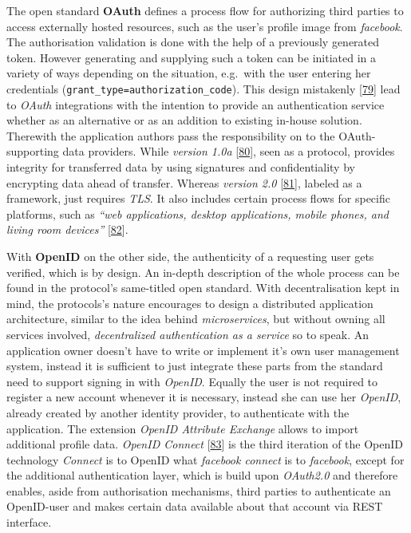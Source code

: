 \documentclass[12pt,english,a4paper,titlepage,cleardoublepage=empty,dottedtoc]{report}
\begin{document}
The open standard \textbf{OAuth} defines a process flow for authorizing
third parties to access externally hosted resources, such as the user's
profile image from \emph{facebook}. The authorisation validation is done
with the help of a previously generated token. However generating and
supplying such a token can be initiated in a variety of ways depending
on the situation, e.g.~with the user entering her credentials
(\texttt{grant\_type=authorization\_code}). This design mistakenly
{[}\protect\hyperlink{ref-web_2012_problem-with-oauth-for-authentication}{79}{]}
lead to \emph{OAuth} integrations with the intention to provide an
authentication service whether as an alternative or as an addition to
existing in-house solution. Therewith the application authors pass the
responsibility on to the OAuth-supporting data providers. While
\emph{version 1.0a} {[}\protect\hyperlink{ref-web_spec_oauth-1a}{80}{]},
seen as a protocol, provides integrity for transferred data by using
signatures and confidentiality by encrypting data ahead of transfer.
Whereas \emph{version 2.0}
{[}\protect\hyperlink{ref-web_spec_oauth-2}{81}{]}, labeled as a
framework, just requires \emph{TLS}. It also includes certain process
flows for specific platforms, such as \emph{``web applications, desktop
applications, mobile phones, and living room devices''}
{[}\protect\hyperlink{ref-web_2016_oauth-2}{82}{]}.

With \textbf{OpenID} on the other side, the authenticity of a requesting
user gets verified, which is by design. An in-depth description of the
whole process can be found in the protocol's same-titled open standard.
With decentralisation kept in mind, the protocols's nature encourages to
design a distributed application architecture, similar to the idea
behind \emph{microservices}, but without owning all services involved,
\emph{decentralized authentication as a service} so to speak. An
application owner doesn't have to write or implement it's own user
management system, instead it is sufficient to just integrate these
parts from the standard need to support signing in with \emph{OpenID}.
Equally the user is not required to register a new account whenever it
is necessary, instead she can use her \emph{OpenID}, already created by
another identity provider, to authenticate with the application. The
extension \emph{OpenID Attribute Exchange} allows to import additional
profile data. \emph{OpenID Connect}
{[}\protect\hyperlink{ref-web_spec_openid-connect-1}{83}{]} is the third
iteration of the OpenID technology \emph{Connect} is to OpenID what
\emph{facebook connect} is to \emph{facebook}, except for the additional
authentication layer, which is build upon \emph{OAuth2.0} and therefore
enables, aside from authorisation mechanisms, third parties to
authenticate an OpenID-user and makes certain data available about that
account via REST interface.
\end{document}
